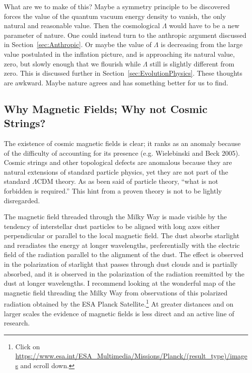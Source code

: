 \documentclass[fleqn,usenatbib]{mnras}
\begin{document}
What are we to make of this? Maybe a symmetry principle to be discovered forces the value of the quantum vacuum energy density to vanish, the only natural and reasonable value. Then the cosmological $\Lambda$ would have to be a new parameter of nature. One could instead turn to the anthropic argument discussed in Section~\ref{sec:Anthropic}. Or maybe the value of  $\Lambda$ is decreasing from the large value postulated in the inflation picture, and is approaching its natural value, zero, but slowly enough that we flourish while $\Lambda$ still is slightly different from zero. This is discussed further in Section~\ref{sec:EvolutionPhysics}. These thoughts are awkward. Maybe nature agrees and has something better for us to find.  

\subsection{Why Magnetic Fields; Why not Cosmic Strings?}

The existence of cosmic magnetic fields is clear; it ranks as an anomaly because of the difficulty of accounting for its presence (e.g. Wielebinski and Beck 2005). Cosmic strings and other topological defects are anomalous because they are natural extensions of standard particle physics, yet they are not part of the standard $\Lambda$CDM theory. As as been said of particle theory, ``what is not forbidden is required.'' This hint from a proven theory is not to be lightly disregarded. 

The magnetic field threaded through the Milky Way is made visible by the tendency of interstellar dust particles to be aligned with long axes either perpendicular or parallel to the local magnetic field. The dust absorbs starlight and reradiates the energy at longer wavelengths, preferentially with the electric field of the radiation parallel to the alignment of the dust. The effect is observed in the polarization of starlight that passes through dust clouds and is partially absorbed, and it is observed in the polarization of the radiation reemitted by the dust at longer wavelengths. I recommend looking at the wonderful map of the magnetic field threading the Milky Way from observations of this polarized radiation obtained by the ESA Planck Satellite.\footnote{Click on \url{https://www.esa.int/ESA_Multimedia/Missions/Planck/(result_type)/images} and scroll down.}  At greater distances and on larger scales the evidence of magnetic fields is less direct and an active line of research.
\end{document}
